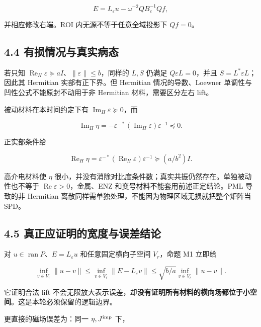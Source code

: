 \documentclass[11pt,a4paper]{article}
\begin{document}
\[
E=L_\varepsilon u-\omega^{-2}QB_\varepsilon^{-1}Qf,
\]

并相应修改右端。ROI 内无源不等于任意全域投影下 \(Qf=0\)。

\hypertarget{ux6709ux635fux60c5ux51b5ux4e0eux771fux5b9eux75c5ux6001}{%
\subsection{4.4
有损情况与真实病态}\label{ux6709ux635fux60c5ux51b5ux4e0eux771fux5b9eux75c5ux6001}}

若只知
\(\operatorname{Re}_H\varepsilon\succeq aI\)、\(\|\varepsilon\|\le b\)，同样的
\(L,S\) 仍满足 \(Q\varepsilon L=0\)，并且 \(S=L^*\varepsilon L\)；因此其
Hermitian 实部有正下界。但 Hermitian 情况的导数、Loewner
单调性与凹性公式不能原封不动用于非 Hermitian 材料，需要区分左右 lift。

被动材料在本时间约定下有 \(\operatorname{Im}_H\varepsilon\succeq0\)，而

\[
\operatorname{Im}_H\eta
=-\varepsilon^{-*}(\operatorname{Im}_H\varepsilon)\varepsilon^{-1}\preceq0.
\]

正实部条件给

\[
\operatorname{Re}_H\eta
=\varepsilon^{-*}(\operatorname{Re}_H\varepsilon)\varepsilon^{-1}
\succeq(a/b^2)I.
\]

高介电材料使 \(\eta\)
很小，并没有消除对比度条件数；真实共振仍然存在。单独被动性也不等于
\(\operatorname{Re}\varepsilon>0\)，金属、ENZ
和变号材料不能套用前述正定结论。PML 导致的非 Hermitian
离散同样需单独处理，不能因为物理区域无损就把整个矩阵当 SPD。

\hypertarget{ux771fux6b63ux5e94ux8bc1ux660eux7684ux5bbdux5ea6ux4e0eux8befux5deeux7ed3ux8bba}{%
\subsection{4.5
真正应证明的宽度与误差结论}\label{ux771fux6b63ux5e94ux8bc1ux660eux7684ux5bbdux5ea6ux4e0eux8befux5deeux7ed3ux8bba}}

对 \(u\in\operatorname{ran}P\)、\(E=L_\varepsilon u\)
和任意固定横向子空间 \(V_r\)，命题 M1 立即给

\[
\inf_{v\in V_r}\|u-v\|
\le\inf_{v\in V_r}\|E-L_\varepsilon v\|
\le\sqrt{b/a}\inf_{v\in V_r}\|u-v\|.
\]

它证明合法 lift
不会无限放大表示误差，却\textbf{没有证明所有材料的横向场都位于小空间}。这是本轮必须保留的逻辑边界。

更直接的磁场误差为：同一 \(\eta,J^{\rm imp}\) 下，
\end{document}
